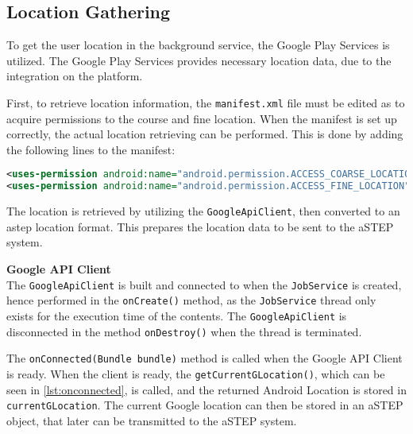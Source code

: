 \subsection{Location Gathering}
To get the user location in the background service, the Google Play Services is utilized.
The Google Play Services provides necessary location data, due to the integration on the platform.

First, to retrieve location information, the \texttt{manifest.xml} file must be edited as to acquire permissions to the course and fine location.
When the manifest is set up correctly, the actual location retrieving can be performed.
This is done by adding the following lines to the manifest:
\begin{lstlisting}[language=XML]
<uses-permission android:name="android.permission.ACCESS_COARSE_LOCATION"/>
<uses-permission android:name="android.permission.ACCESS_FINE_LOCATION"/>
\end{lstlisting}

The location is retrieved by utilizing the \texttt{GoogleApiClient}, then converted to an \gls{astep} location format.
This prepares the location data to be sent to the aSTEP system.


\textbf{Google API Client}\\
The \texttt{GoogleApiClient} is built and connected to when the \texttt{JobService} is created, hence performed in the \texttt{onCreate()} method, as the \texttt{JobService} thread only exists for the execution time of the contents.
The \texttt{GoogleApiClient} is disconnected in the method \texttt{onDestroy()} when the thread is terminated.

\iffalse
\begin{lstlisting}[caption={onCreate()},label={lst:oncreate},language=Java]
@Override
public void onCreate() {
	// Set the current Context to this
	context = this;
	// Builds the Google API Client to enable location
	buildGoogleApiClient();
	// Connects the Google API Client. It broadcasts to onConnect() when connected.
	connectApi();
}
\end{lstlisting}
\fi



The \texttt{onConnected(Bundle bundle)} method is called when the Google API Client is ready.
When the client is ready, the \texttt{getCurrentGLocation()}, which can be seen in \ref{lst:onconnected}, is called, and the returned Android Location is stored in \texttt{currentGLocation}. 
The current Google location can then be stored in an aSTEP object, that later can be transmitted to the aSTEP system.

